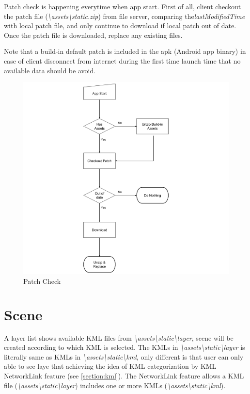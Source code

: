 Patch check is happening everytime when app start. First of all, client checkout the patch file (\emph{\textbackslash assets\textbackslash static.zip}) from file server, comparing the\emph{lastModifiedTime} with local patch file, and only continue to download if local patch out of date. Once the patch file is downloaded, replace any existing files.

Note that a build-in default patch is included in the apk (Android app binary) in case of client disconnect from internet during the first time launch time that no available data should be avoid.

\begin{figure}[H]
\caption[patch-check]{Patch Check}
\label{fig:patch-check}
\centering
\includegraphics[width=\linewidth]{Figures/patch-check.png}
\decoRule
\end{figure}

\section{Scene}
\label{section:scene}

A layer list shows available KML files from \emph{\textbackslash assets\textbackslash static\textbackslash layer}, scene will be created according to which KML is selected. The KMLs in \emph{\textbackslash assets\textbackslash static\textbackslash layer} is literally same as KMLs in \emph{\textbackslash assets\textbackslash static\textbackslash kml}, only different is that user can only able to see laye that achieving the idea of KML categorization by KML NetworkLink feature (see \ref{section:kml}). The NetworkLink feature allows a KML file (\emph{\textbackslash assets\textbackslash static\textbackslash layer}) includes one or more KMLs (\emph{\textbackslash assets\textbackslash static\textbackslash kml}).

